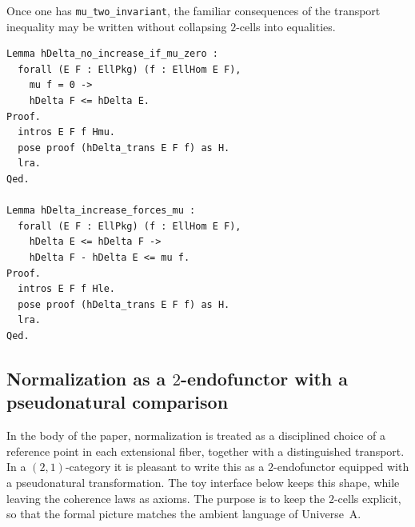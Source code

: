 \documentclass[10pt, reqno]{amsart}
\theoremstyle{plain}
\theoremstyle{definition}
\theoremstyle{plain}
\begin{document}
Once one has \texttt{mu\_two\_invariant}, the familiar consequences of the transport inequality may be written without collapsing $2$-cells into equalities.

\begin{scriptsize}
\begin{verbatim}
Lemma hDelta_no_increase_if_mu_zero :
  forall (E F : EllPkg) (f : EllHom E F),
    mu f = 0 ->
    hDelta F <= hDelta E.
Proof.
  intros E F f Hmu.
  pose proof (hDelta_trans E F f) as H.
  lra.
Qed.

Lemma hDelta_increase_forces_mu :
  forall (E F : EllPkg) (f : EllHom E F),
    hDelta E <= hDelta F ->
    hDelta F - hDelta E <= mu f.
Proof.
  intros E F f Hle.
  pose proof (hDelta_trans E F f) as H.
  lra.
Qed.
\end{verbatim}
\end{scriptsize}

\subsection{Normalization as a $2$-endofunctor with a pseudonatural comparison}\label{subsec:CoqPseudoNat}

In the body of the paper, normalization is treated as a disciplined choice of a reference point in each extensional fiber, together with a distinguished transport. In a $(2,1)$-category it is pleasant to write this as a $2$-endofunctor equipped with a pseudonatural transformation. The toy interface below keeps this shape, while leaving the coherence laws as axioms. The purpose is to keep the $2$-cells explicit, so that the formal picture matches the ambient language of Universe~A.
\end{document}
